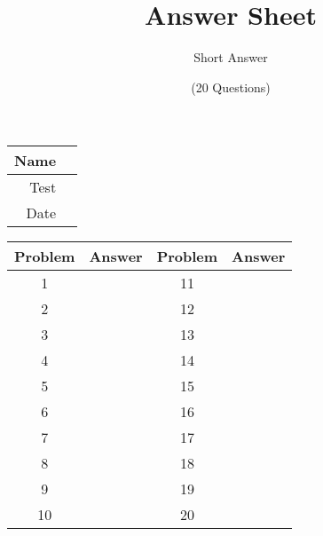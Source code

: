 \documentclass[a4paper, 12pt]{article}
\title{Answer Sheet}
\author{Short Answer}
\date{(20 Questions)}
\begin{document}
\maketitle

\begin{center}
\begin{tabular}{|r|r|}
\hline
	\hspace{3em} Name & \hspace{30em} \\\hline
	Test & \qquad \\ \hline
	Date & \qquad \\ \hline
\end{tabular}
\end{center}

\begin{center}
\begin{tabularx}{\textwidth}{|c|l|c|X|}\hline
	Problem & Answer & Problem & Answer \\\hline
	1 & \hspace{13.45em} & 11 & \\\hline
	2 & & 12 & \\\hline
	3 & & 13 & \\\hline
	4 & & 14 & \\\hline
	5 & & 15 & \\\hline
	6 & & 16 & \\\hline
	7 & & 17 & \\\hline
	8 & & 18 & \\\hline
	9 & & 19 & \\\hline
	10 & & 20 & \\\hline
\end{tabularx}
\end{center}
\end{document}
